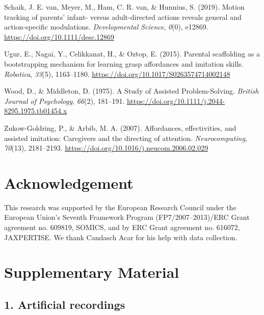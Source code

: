 \documentclass[
  man,floatsintext]{apa6}
\newlength{\cslhangindent}
\newlength{\cslentryspacingunit} %
\newenvironment{CSLReferences}[2] %
 {%
  \setlength{\parindent}{0pt}
  \ifodd #1
  \let\oldpar\par
  \def\par{\hangindent=\cslhangindent\oldpar}
  \fi
  \setlength{\parskip}{#2\cslentryspacingunit}
 }%
 {}
\begin{document}
\begin{CSLReferences}{1}{0}
\leavevmode{}%
Schaik, J. E. van, Meyer, M., Ham, C. R. van, \& Hunnius, S. (2019). Motion tracking of parents' infant- versus adult-directed actions reveals general and action-specific modulations. \emph{Developmental Science}, \emph{0}(0), e12869. \url{https://doi.org/10.1111/desc.12869}

\leavevmode{}%
Ugur, E., Nagai, Y., Celikkanat, H., \& Oztop, E. (2015). Parental scaffolding as a bootstrapping mechanism for learning grasp affordances and imitation skills. \emph{Robotica}, \emph{33}(5), 1163--1180. \url{https://doi.org/10.1017/S0263574714002148}

\leavevmode{}%
Wood, D., \& Middleton, D. (1975). A {Study} of {Assisted Problem-Solving}. \emph{British Journal of Psychology}, \emph{66}(2), 181--191. \url{https://doi.org/10.1111/j.2044-8295.1975.tb01454.x}

\leavevmode{}%
Zukow-Goldring, P., \& Arbib, M. A. (2007). Affordances, effectivities, and assisted imitation: {Caregivers} and the directing of attention. \emph{Neurocomputing}, \emph{70}(13), 2181--2193. \url{https://doi.org/10.1016/j.neucom.2006.02.029}

\end{CSLReferences}

\endgroup

\hypertarget{acknowledgement}{%
\section{Acknowledgement}\label{acknowledgement}}

This research was supported by the European Research Council under the European Union's Seventh Framework Program (FP7/2007--2013)/ERC Grant agreement no. 609819, SOMICS, and by ERC Grant agreement no. 616072, JAXPERTISE. We thank Candasch Acar for his help with data collection.

\clearpage

\hypertarget{supplementary-material}{%
\section{Supplementary Material}\label{supplementary-material}}

\hypertarget{artificial-recordings}{%
\subsection{1. Artificial recordings}\label{artificial-recordings}}
\end{document}

